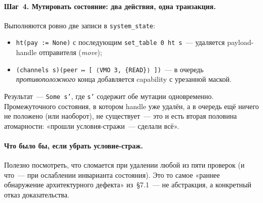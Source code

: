 \documentclass[11pt,a4paper]{article}
\begin{document}
\paragraph{Шаг~4. Мутировать состояние: два действия, одна транзакция.}
Выполняются ровно две записи в \texttt{system\_state}:
\begin{itemize}[leftmargin=1.4em]
	\item \texttt{ht(pay := None)} с последующим
	      \texttt{set\_table 0 ht s}~--- удаляется payload-handle
	      отправителя (\emph{move});
	\item \texttt{(channels s)(peer ↦ [\,⟨VMO 3, \{READ\}⟩\,])}~--- в очередь
	      \emph{противоположного} конца добавляется \textenglish{capability}
	      с урезанной маской.
\end{itemize}
Результат~--- \texttt{Some s'}, где \texttt{s'} содержит обе мутации
одновременно. Промежуточного состояния, в котором handle уже удалён,
а в очередь ещё ничего не положено (или наоборот), не существует~---
это и есть вторая половина атомарности: «прошли условия-стражи~--- сделали всё».

\paragraph{Что было бы, если убрать условие-страж.}
Полезно посмотреть, что сломается при удалении любой из пяти проверок
(и что~--- при ослаблении инварианта состояния).
Это то самое «раннее обнаружение архитектурного дефекта» из~§7.1~--- не
абстракция, а конкретный отказ доказательства.
\end{document}
